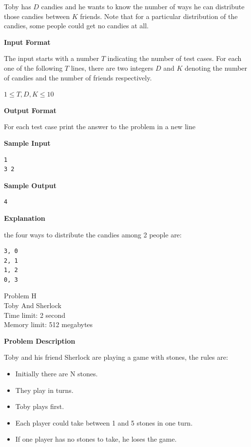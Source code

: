 \documentclass[11pt]{article}
\begin{document}
Toby has $D$ candies and he wants to know the number of ways he can distribute
those candies between $K$ friends. Note that for a particular distribution of the
candies, some people could get no candies at all.

\textbf{\large Input Format}

The input starts with a number $T$ indicating the number of test cases. For each one
of the following $T$ lines, there are two integers $D$ and $K$ denoting the number
of candies and the number of friends respectively.

$1 \le T, D, K \le 10$

\textbf{\large Output Format}

For each test case print the answer to the problem in a new line

\textbf{\large Sample Input}

\begin{verbatim}
1
3 2
\end{verbatim}

\textbf{\large Sample Output}

\begin{verbatim}
4
\end{verbatim}

\textbf{\large Explanation}

the four ways to distribute the candies among 2 people are:

\begin{verbatim}
3, 0
2, 1
1, 2
0, 3
\end{verbatim}

\newpage
        \begin{center}
            {\LARGE Problem H}\\
            {\Large Toby And Sherlock}\\
            {Time limit: 2 second}\\
            {Memory limit: 512 megabytes}
        \end{center}\textbf{\large Problem Description}

Toby and his friend Sherlock are playing a game with stones, the rules are:
\begin{itemize}
\item Initially there are N stones.
\item  They play in turns.
\item  Toby plays first.
\item  Each player could take between 1 and 5 stones in one turn.
\item  If one player has no stones to take, he loses the game.
\end{itemize}
\end{document}
